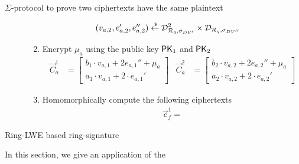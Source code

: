 \begin{section}{$\Sigma$-protocol to prove two ciphertexts have the same plaintext}
\begin{description}
\begin{enumerate}
\begin{align*}
          (v_{a,2}, e_{a,2}', e_{a,2}'') &\stackrel{{\scriptscriptstyle \mkern4mu \$}}{\gets} \mathcal{D}_{{\mathcal{R}}_q, \sigma_{DV'}}^2 \times \mathcal{D}_{{\mathcal{R}}_q, \sigma_{DV''}}
        \end{align*}
        \item Encrypt $\mu_a$ using the public key $\mathsf{PK}_1$ and $\mathsf{PK}_2$
        \begin{align*}
          \vec{C}_{a}^{1} &=
          \begin{bmatrix} b_1 \cdot v_{a,1} + 2 e_{a,1}''+ \mu_a  \\
            a_1 \cdot v_{a,1} + 2 \cdot e_{a,1}' \end{bmatrix} &
            \vec{C}_{a}^{2} &= \begin{bmatrix} b_2 \cdot v_{a,2} + 2 e_{a,2}''+ \mu_a \\
            a_2 \cdot v_{a,2} + 2 \cdot e_{a,2}' \end{bmatrix}
        \end{align*}
        \item Homomorphically compute the following ciphertexts
        \begin{align*}
          \vec{c}^1_f =  
        \end{align*}
      \end{enumerate}
  \end{description}
\end{section}

\begin{section}{Ring-LWE based ring-signature}

  In this section, we give an application of the


\end{section}

